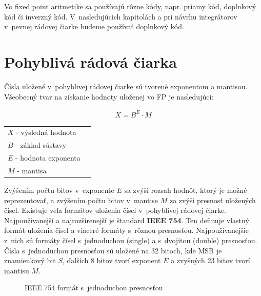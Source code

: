 Vo fixed point aritmetike sa používajú rôzne kódy, napr. priamy kód, doplnkový kód či inverzný kód. V~nasledujúcich kapitolách a pri návrhu integrátorov v~pevnej rádovej čiarke budeme používať doplnkový kód. 

\newpage
\section{Pohyblivá rádová čiarka}
Čísla uložené v~pohyblivej rádovej čiarke sú tvorené exponentom a mantisou. Všeobecný tvar na získanie hodnoty uloženej vo FP je nasledujúci:

\begin{eqnarray}
X = B^{E}\cdot M
\end{eqnarray}

\begin{tabular}{ll}
$ X $ - výsledná hodnota \\
$ B $ - základ sústavy \\
$ E $ - hodnota exponenta \\
$ M $ - mantisa \\
\end{tabular}
\bigskip

Zvýšením počtu bitov v~exponente $ E $ sa zvýši rozsah hodnôt, ktorý je možné reprezentovať, a zvýšením počtu bitov v~mantise $ M $ za zvýši presnosť uložených čísel. Existuje veľa formátov uloženia čísel v~pohyblivej rádovej čiarke. Najpoužívanejší a najrozšírenejší je štandard \textbf{IEEE 754}. Ten definuje vlastný formát uloženia čísel a viaceré formáty s~rôznou presnosťou. Najpoužívanejšie z~nich sú formáty čísel s~jednoduchou (single) a s~dvojitou (double) presnosťou. Čísla s~jednoduchou presnosťou sú uložené na 32 bitoch, kde MSB je znamienkový bit $ S $, ďalších 8 bitov tvorí exponent $ E $ a zvyšných 23 bitov tvorí mantisu $ M $.

\bigskip
\begin{figure}[h]
\centering
{}
\caption{IEEE 754 formát s~jednoduchou presnosťou}
\label{formatFP32}
\end{figure}


